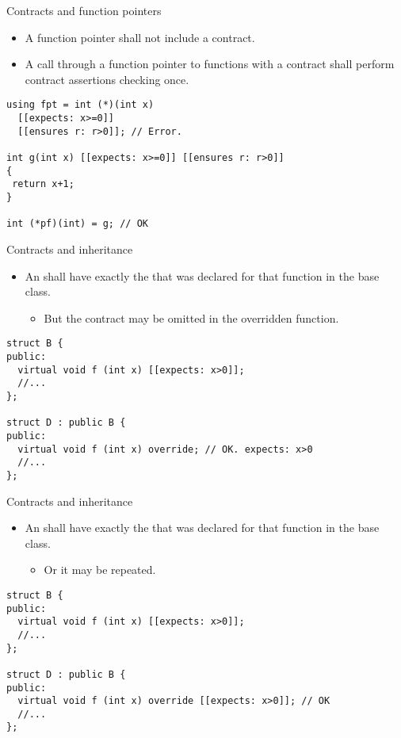 \begin{frame}[t,fragile]{Contracts and function pointers}
\begin{itemize}
  \item A function pointer shall not include a contract.
  \item A call through a function pointer to functions with
a contract shall perform contract assertions checking once.
\end{itemize}

\vfill\pause
\begin{lstlisting}
using fpt = int (*)(int x)
  [[expects: x>=0]]
  [[ensures r: r>0]]; // Error. 

int g(int x) [[expects: x>=0]] [[ensures r: r>0]]
{
 return x+1;
}

int (*pf)(int) = g; // OK
\end{lstlisting}
\end{frame}

\begin{frame}[t,fragile]{Contracts and inheritance}
\begin{itemize}
  \item An  shall have exactly the  that was declared for that function in the base class.
    \begin{itemize}
      \item But the contract may be omitted in the overridden function.
    \end{itemize}
\end{itemize}

\vfill\pause
\begin{lstlisting}
struct B {
public:
  virtual void f (int x) [[expects: x>0]];
  //...
};

struct D : public B {
public:
  virtual void f (int x) override; // OK. expects: x>0
  //...
};
\end{lstlisting}
\end{frame}

\begin{frame}[t,fragile]{Contracts and inheritance}
\begin{itemize}
  \item An  shall have exactly the  that was declared for that function in the base class.
    \begin{itemize}
      \item Or it may be repeated.
    \end{itemize}
\end{itemize}

\vfill\pause

\begin{lstlisting}
struct B {
public:
  virtual void f (int x) [[expects: x>0]];
  //...
};

struct D : public B {
public:
  virtual void f (int x) override [[expects: x>0]]; // OK
  //...
};
\end{lstlisting}
\end{frame}

